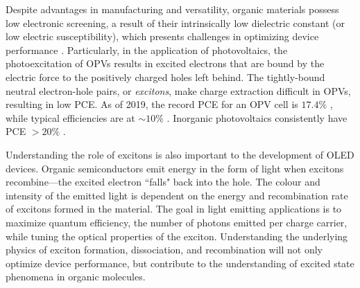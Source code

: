 
Despite advantages in manufacturing and versatility, organic materials possess low electronic screening, a result of their intrinsically low dielectric constant (or low electric susceptibility), which presents challenges in optimizing device performance \citep{gregg2003comparing}. Particularly, in the application of photovoltaics, the photoexcitation of \acp{OPV} results in excited electrons that are bound by the electric force to the positively charged holes left behind. The tightly-bound neutral electron-hole pairs, or \emph{excitons}, make charge extraction difficult in \acp{OPV}, resulting in low \ac{PCE}. As of 2019, the record \ac{PCE} for an \ac{OPV} cell is $17.4\%$ \citep{Meng2018,Cui2019}, while typical efficiencies are at $\sim 10\%$ \citep{NREL2019champion}. Inorganic photovoltaics consistently have \ac{PCE} $> 20\%$ \citep{NREL2019research}.



Understanding the role of excitons is also important to the development of \ac{OLED} devices. Organic semiconductors emit energy in the form of light when excitons recombine---the excited electron ``falls" back into the hole. The colour and intensity of the emitted light is dependent on the energy and recombination rate of excitons formed in the material. The goal in light emitting applications is to maximize quantum efficiency, the number of photons emitted per charge carrier, while tuning the optical properties of the exciton. Understanding the underlying physics of exciton formation, dissociation, and recombination will not only optimize device performance, but contribute to the understanding of excited state phenomena in organic molecules.






